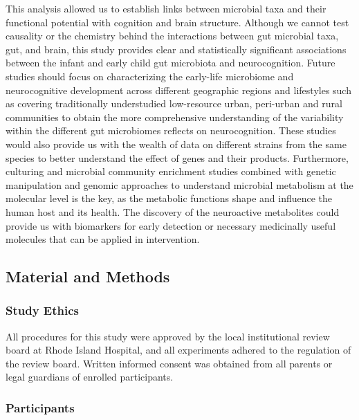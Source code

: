 \documentclass[
]{article}
\begin{document}
This analysis allowed us to establish links between microbial taxa and
their functional potential with cognition and brain structure. Although
we cannot test causality or the chemistry behind the interactions
between gut microbial taxa, gut, and brain, this study provides clear
and statistically significant associations between the infant and early
child gut microbiota and neurocognition. Future studies should focus on
characterizing the early-life microbiome and neurocognitive development
across different geographic regions and lifestyles such as covering
traditionally understudied low-resource urban, peri-urban and rural
communities to obtain the more comprehensive understanding of the
variability within the different gut microbiomes reflects on
neurocognition. These studies would also provide us with the wealth of
data on different strains from the same species to better understand the
effect of genes and their products. Furthermore, culturing and microbial
community enrichment studies combined with genetic manipulation and
genomic approaches to understand microbial metabolism at the molecular
level is the key, as the metabolic functions shape and influence the
human host and its health. The discovery of the neuroactive metabolites
could provide us with biomarkers for early detection or necessary
medicinally useful molecules that can be applied in intervention.

\hypertarget{material-and-methods}{%
\subsection{Material and Methods}\label{material-and-methods}}

\hypertarget{study-ethics}{%
\subsubsection{Study Ethics}\label{study-ethics}}

All procedures for this study were approved by the local institutional
review board at Rhode Island Hospital, and all experiments adhered to
the regulation of the review board. Written informed consent was
obtained from all parents or legal guardians of enrolled participants.

\hypertarget{participants}{%
\subsubsection{Participants}\label{participants}}
\end{document}
